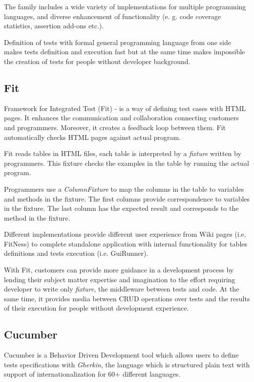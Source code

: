The family includes a wide variety of implementations for multiple programming languages, and diverse enhancement of functionality (e. g. code coverage statistics, assertion add-ons etc.)\cite{xunitWiki}.

Definition of tests with formal general programming language from one side makes tests definition and execution fast but at the same time makes impossible the creation of tests for people without developer background. 

\subsection{Fit}
Framework for Integrated Test (Fit) - is a way of defining test cases with HTML pages. It enhances the communication and collaboration connecting customers and programmers. Moreover, it creates a feedback loop between them. Fit automatically checks HTML pages against actual program\cite{fit}.

Fit reads tables in HTML files, each table is interpreted by a \textit{fixture} written by programmers. This fixture checks the examples in the table by running the actual program\cite{fitIntro}.

Programmers use a \textit{ColumnFixture} to map the columns in the table to variables and methods in the fixture. The first columns provide correspondence to variables in the fixture. The last column has the expected result and corresponds to the method in the fixture\cite{fitIntro}.

Different implementations provide different user experience from Wiki pages (i.e. FitNess) to complete standalone application with internal functionality for tables definitions and tests execution (i.e. GuiRunner).

With Fit, customers can provide more guidance in a development process by lending their subject matter expertise and imagination to the effort\cite{fit} requiring developer to write only \textit{fixture}, the middleware between tests and code. At the same time, it provides media between  CRUD operations over tests and the results of their execution for people without development experience.

\subsection{Cucumber}
Cucumber is a Behavior Driven Development tool which allows users to define tests specifications with \textit{Gherkin}, the language which is structured plain text with support of internationalization for 60+ different languages\cite{cuceRef}.


